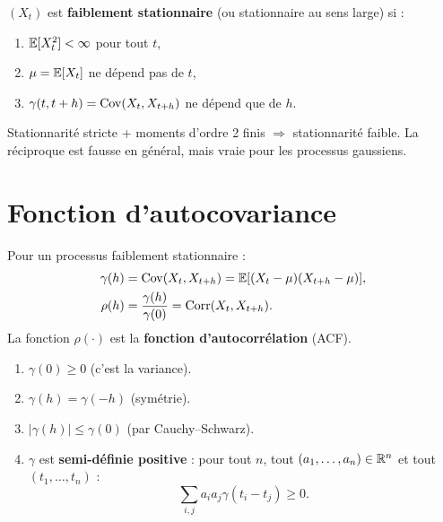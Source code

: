 \begin{definition}
$(X_t)$ est \textbf{faiblement stationnaire} (ou stationnaire au sens large) si :
\begin{enumerate}
\item $\mathbb{E}[X_t^2]<\infty$ pour tout $t$,
\item $\mu = \mathbb{E}[X_t]$ ne d\'epend pas de $t$,
\item $\gamma(t,t+h) = \operatorname{Cov}(X_t,X_{t+h})$ ne d\'epend que de $h$.
\end{enumerate}
\end{definition}

\begin{remarque}
Stationnarit\'e stricte + moments d'ordre 2 finis $\Rightarrow$ stationnarit\'e faible. La r\'eciproque est fausse en g\'en\'eral, mais vraie pour les processus gaussiens.
\end{remarque}

\section{Fonction d'autocovariance}

\begin{definition}
Pour un processus faiblement stationnaire :
\begin{align}
\gamma(h) &= \operatorname{Cov}(X_t,X_{t+h}) = \mathbb{E}[(X_t-\mu)(X_{t+h}-\mu)], \\
\rho(h) &= \frac{\gamma(h)}{\gamma(0)} = \operatorname{Corr}(X_t,X_{t+h}).
\end{align}
La fonction $\rho(\cdot)$ est la \textbf{fonction d'autocorr\'elation} (ACF).
\end{definition}

\begin{theoreme}\label{thm:gamma-prop}
\begin{enumerate}
\item $\gamma(0)\geq 0$ (c'est la variance).
\item $\gamma(h)=\gamma(-h)$ (sym\'etrie).
\item $|\gamma(h)|\leq\gamma(0)$ (par Cauchy--Schwarz).
\item $\gamma$ est \textbf{semi-d\'efinie positive} : pour tout $n$, tout $(a_1,\ldots,a_n)\in\mathbb{R}^n$ et tout $(t_1,\ldots,t_n)$ :
\[
\sum_{i,j}a_i a_j\gamma(t_i-t_j)\geq 0.
\]
\end{enumerate}
\end{theoreme}


